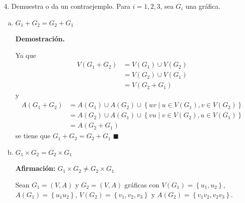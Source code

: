 \documentclass[fleqn]{article}
\begin{document}
    4. Demuestra o da un contraejemplo. Para $ i = 1,2,3 $, sea $ G_i $ una gráfica.
    \begin{enumerate}[a)]
        \item $ G_1 + G_2 = G_2 + G_1 $
        
        \textbf{Demostración.}

        Ya que 
        \begin{align*}
            V \left( G_1 + G_2 \right) &= V \left( G_1 \right) \cup V \left( G_2 \right) \\
            &= V \left( G_2 \right) \cup V \left( G_1 \right) \\
            &= V \left( G_2 + G_1 \right)
        \end{align*}
        y
        \begin{align*}
            A \left( G_1 + G_2 \right) &= A \left( G_1 \right) \cup A \left( G_2 \right) \cup \left\lbrace uv \mid u \in V \left( G_1 \right), v \in V \left( G_2 \right) \right\rbrace \\
            &= A \left( G_2 \right) \cup A \left( G_1 \right) \cup \left\lbrace vu \mid v \in V \left( G_2 \right), u \in V \left( G_1 \right) \right\rbrace \\
            &= A \left( G_2 + G_1 \right) 
        \end{align*}
        se tiene que $ G_1 + G_2 = G_2 + G_1 $ \hfill $ \blacksquare $

        \item $ G_1 \times G_2 = G_2 \times G_1 $
        
        \textbf{Afirmación:} $ G_1 \times G_2 \neq G_2 \times G_1 $

        Sean $ G_1 = \left( V, A \right) $ y $ G_2 = \left( V, A \right) $ gráficas con $ V \left( G_1 \right) = \left\lbrace u_1, u_2 \right\rbrace $, $ A \left( G_1 \right) = \left\lbrace u_1u_2 \right\rbrace $, $ V \left( G_2 \right) = \left\lbrace v_1, v_2, v_3 \right\rbrace $ y $ A \left( G_2 \right) = \left\lbrace v_1v_2, v_2v_3 \right\rbrace $.


\end{enumerate}
\end{document}
